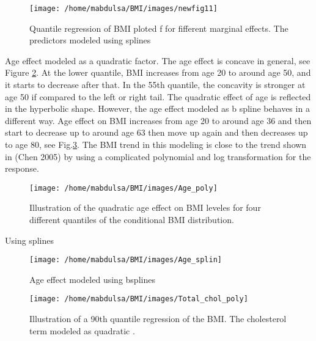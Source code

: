 \documentclass[
  12pt,
]{article}
\begin{document}
\begin{figure}

{\centering \texttt{[image: /home/mabdulsa/BMI/images/newfig11]} 

}

\caption{Quantile regression of BMI ploted f for fifferent marginal effects. The predictors modeled using splines }\label{fig:resu12}
\end{figure}

Age effect modeled as a quadratic factor. The age effect is concave in general, see Figure \ref{fig:resu3}. At the lower quantile, BMI increases from age 20 to around age 50, and it starts to decrease after that. In the 55th quantile, the concavity is stronger at age 50 if compared to the left or right tail. The quadratic effect of age is reflected in the hyperbolic shape. However, the age effect modeled as b spline behaves in a different way. Age effect on BMI increases from age 20 to around age 36 and then start to decrease up to around age 63 then move up again and then decreases up to age 80, see Fig.\ref{fig:resu33}. The BMI trend in this modeling is close to the trend shown in (Chen 2005) by using a complicated polynomial and log transformation for the response.

\begin{figure}

{\centering \texttt{[image: /home/mabdulsa/BMI/images/Age\_poly]} 

}

\caption{Illustration of the quadratic age effect on BMI leveles for four different quantiles of the conditional BMI distribution. }\label{fig:resu3}
\end{figure}

Using splines

\begin{figure}

{\centering \texttt{[image: /home/mabdulsa/BMI/images/Age\_splin]} 

}

\caption{Age effect modeled using bsplines }\label{fig:resu33}
\end{figure}

\begin{figure}

{\centering \texttt{[image: /home/mabdulsa/BMI/images/Total\_chol\_poly]} 

}

\caption{Illustration of a 90th quantile regression of the BMI. The cholesterol term modeled as  quadratic .}\label{fig:resu4}
\end{figure}
\end{document}
